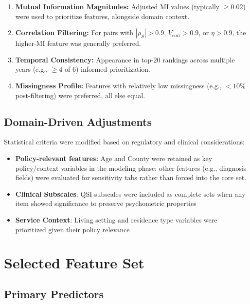 \begin{enumerate}
  \item \textbf{Mutual Information Magnitudes:} Adjusted MI values (typically $\ge 0.02$) were used to prioritize features, alongside domain context.
  \item \textbf{Correlation Filtering:} For pairs with $|\rho_S|>0.9$, $V_{\text{corr}}>0.9$, or $\eta>0.9$, the higher-MI feature was generally preferred.
  \item \textbf{Temporal Consistency:} Appearance in top-20 rankings across multiple years (e.g., $\ge 4$ of 6) informed prioritization.
  \item \textbf{Missingness Profile:} Features with relatively low missingness (e.g., $<10\%$ post-filtering) were preferred, all else equal.
\end{enumerate}


\subsection{Domain-Driven Adjustments}

Statistical criteria were modified based on regulatory and clinical considerations:

\begin{itemize}
    \item \textbf{Policy-relevant features:} Age and County were retained as key policy/context variables in the modeling phase; other features (e.g., diagnosis fields) were evaluated for sensitivity tabs rather than forced into the core set.
    
    \item \textbf{Clinical Subscales}: QSI subscales were included as complete sets when any item showed significance to preserve psychometric properties
    
    \item \textbf{Service Context}: Living setting and residence type variables were prioritized given their policy relevance
\end{itemize}

\section{Selected Feature Set}

\subsection{Primary Predictors}

